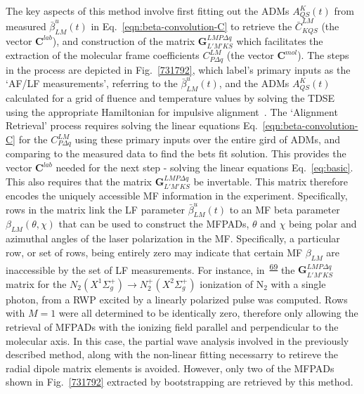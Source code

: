 \documentclass[10pt]{article}
\begin{document}
The key aspects of this method involve first fitting out the ADMs $A^K_{QS}(t)$ from measured $\bar{\beta}^u_{LM}(t)$ in Eq.~\ref{eqn:beta-convolution-C} to retrieve the $\bar{C}^{LM}_{KQS}$ (the vector $\mathbf{C}^{lab}$), and construction of the matrix $\mathbf{{G}}^{LMP\Delta q }_{L'M'KS}$ which facilitates the extraction of the molecular frame coefficients $C^{LM}_{P\Delta q}$ (the vector $\mathbf{C}^{mol}$). The steps in the process are depicted in Fig.~\ref{731792}, which label's primary inputs as the `AF/LF measurements', referring to the $\bar{\beta}^u_{LM}(t)$, and the ADMs $A^K_{QS}(t)$ calculated for a grid of fluence and temperature values by solving the TDSE using the appropriate Hamiltonian for impulsive alignment~\cite{}. The `Alignment Retrieval' process requires solving the linear equations Eq.~\ref{eqn:beta-convolution-C} for the $C^{LM}_{P\Delta q}$ using these primary inputs over the entire gird of ADMs, and comparing to the measured data to find the bets fit solution. This provides the vector $\mathbf{C}^{lab}$ needed for the next step - solving the linear equations Eq.~\ref{eq:basic}. This also requires that the matrix $\mathbf{{G}}^{LMP\Delta q }_{L'M'KS}$ be invertable. This matrix therefore encodes the uniquely accessible MF information in the experiment. Specifically, rows in the matrix link the LF parameter $\bar{\beta}^u_{LM}(t)$  to an MF beta parameter $\beta_{LM}(\theta,\chi)$ that can be used to construct the MFPADs, $\theta$ and $\chi$ being polar and azimuthal angles of the laser polarization in the MF. Specifically, a particular row, or set of rows, being entirely zero may indicate that certain MF $\beta_{LM}$ are inaccessible by the set of LF measurements. For instance, in~\textsuperscript{\hyperref[csl:69]{69}} the $\mathbf{{G}}^{LMP\Delta q }_{L'M'KS}$ matrix for the $N_2(X^{1}\Sigma^{+}_{g}) \rightarrow N^+_2(X^{2}\Sigma^{+}_{g})$ ionization of N$_2$ with a single photon, from a RWP excited by a linearly polarized pulse was computed. Rows with $M = 1$ were all determined to be identically zero, therefore only allowing the retrieval of MFPADs with the ionizing field parallel and perpendicular to the molecular axis. In this case, the partial wave analysis involved in the previously described method, along with the non-linear fitting necessarry to retireve the radial dipole matrix elements is avoided. However, only two of the MFPADs shown in Fig.~\ref{731792} extracted by bootstrapping are retrieved by this method.\\
\end{document}
